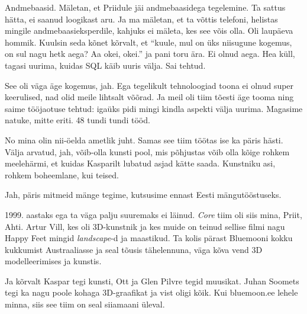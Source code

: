 
Andmebaasid. Mäletan, et Priidule jäi 
andmebaasidega tegelemine. Ta sattus hätta, ei saanud  loogikast aru. Ja ma 
mäletan, et ta võttis telefoni, helistas mingile andmebaasieksperdile, kahjuks 
ei mäleta, kes see võis olla. Oli laupäeva hommik. Kuulsin seda kõnet kõrvalt, 
et \enquote{kuule, mul on üks niisugune kogemus, on sul nagu hetk aega? Aa 
okei, okei.} ja pani toru ära. Ei olnud aega. Hea küll, tagasi uurima, kuidas 
SQL  käib uuris välja. Sai tehtud.


See oli väga äge kogemus, jah. Ega tegelikult tehnoloogiad toona ei olnud super 
keerulised, nad olid meile lihtsalt võõrad. Ja meil oli tiim tõesti äge tooma 
ning saime tööjaotuse tehtud: igaüks pidi mingi kindla aspekti välja uurima. 
Magasime natuke, mitte eriti. 48 tundi tundi tööd.


No mina olin nii-öelda ametlik juht. Samas see tiim töötas ise ka päris hästi. 
Välja arvatud, jah, võib-olla kunsti pool, mis põhjustas võib olla kõige rohkem 
meelehärmi, et kuidas Kasparilt  lubatud asjad kätte 
saada. Kunstniku asi, rohkem boheemlane, kui teised.


Jah, päris mitmeid mänge tegime, kutsusime ennast Eesti mängutööstuseks. 


1999. aastaks ega ta väga palju suuremaks ei läinud. \emph{Core} tiim oli siis 
mina, Priit, Ahti. Artur 
Vill, kes oli 3D-kunstnik ja kes muide on teinud 
sellise filmi nagu Happy Feet mingid \emph{landscape}-d ja maastikud. Ta kolis 
pärast Bluemooni kokku kukkumist Austraaliasse ja seal tõusis tähelennuna, väga 
kõva vend 3D modelleerimises ja kunstis.

Ja kõrvalt Kaspar tegi kunsti, Ott ja Glen Pilvre tegid muusikat. Juhan 
Soomets tegi ka nagu poole kohaga 3D-graafikat ja 
vist oligi kõik. Kui bluemoon.ee lehele minna, siis see tiim on seal siiamaani 
üleval.

